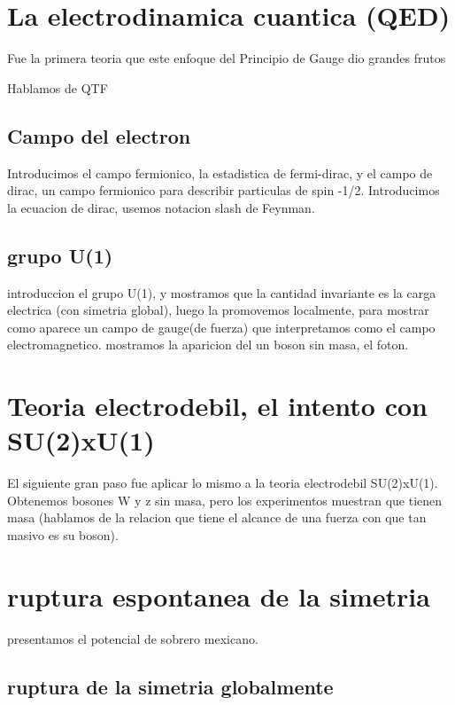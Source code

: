 \section{La electrodinamica cuantica (QED)}

Fue la primera teoria que este enfoque del Principio de Gauge dio grandes frutos

Hablamos de QTF

\subsection{Campo del electron}

Introducimos el campo fermionico, la estadistica de fermi-dirac, y el campo de dirac, un campo fermionico para describir particulas de spin -1/2. Introducimos la ecuacion de dirac, usemos notacion slash de Feynman.

\subsection{grupo U(1)}

introduccion el grupo U(1), y mostramos que la cantidad invariante es la carga electrica (con simetria global), luego la promovemos localmente, para mostrar como aparece un campo de gauge(de fuerza) que interpretamos como el campo electromagnetico. mostramos la aparicion del un boson sin masa, el foton.

\section{Teoria electrodebil, el intento con SU(2)xU(1)}

El siguiente gran paso fue aplicar lo mismo a la teoria electrodebil SU(2)xU(1). Obtenemos bosones W y z sin masa, pero los experimentos muestran que tienen masa (hablamos de la relacion que tiene el alcance de una fuerza con que tan masivo es su boson).


\section{ruptura espontanea de la simetria}

presentamos el potencial de sobrero mexicano.

\subsection{ruptura de la simetria globalmente}


